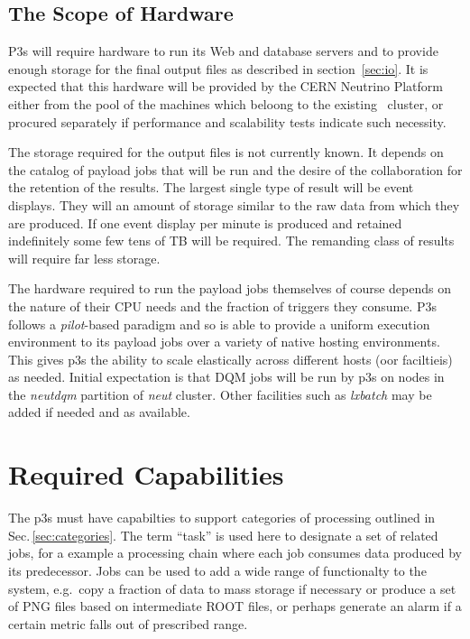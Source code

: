 \documentclass[pdftex,12pt,letter]{article}
\begin{document}
\subsection{The Scope of Hardware}
P3s will require hardware to run its Web and database servers
and to provide enough storage for the final output files as described in
section~\ref{sec:io}.  It is expected that this hardware will be provided
by the CERN Neutrino Platform either from the pool of the machines
which beloong to the existing~\cite{neut} cluster, or procured separately
if performance and scalability tests indicate such necessity.


The storage required for the output files is not currently known.  It
depends on the catalog of payload jobs that will be run and the desire
of the collaboration for the retention of the results.  The largest
single type of result will be event displays.  They will an amount of
storage similar to the raw data from which they are produced.  If one
event display per minute is produced and retained indefinitely some
few tens of TB will be required.  The remanding class of results will
require far less storage.

The hardware required to run the payload jobs themselves of course
depends on the nature of their CPU needs and the fraction of triggers
they consume.  P3s follows a \textit{pilot}-based paradigm and so is
able to provide a uniform execution environment to its payload jobs
over a variety of native hosting environments.  This gives p3s the ability
to scale elastically across different hosts (oor faciltieis) as needed.  Initial expectation
is that DQM jobs will be run by p3s on nodes in the \textit{neutdqm}
partition of \textit{neut} cluster.  Other facilities such as
\textit{lxbatch} \cite{lxbatch} may be added if needed and as available.


\section{Required Capabilities}
\label{sec:capabilities}

The p3s must have capabilties to support categories of processing outlined
in Sec.\,\ref{sec:categories}. The term ``task'' is used here to designate a set
of related jobs, for a example a processing chain where each job consumes
data produced by its predecessor. Jobs can be used to add a wide range
of functionalty to the system, e.g.~copy a fraction of data to mass storage
if necessary or produce a set of PNG files based on intermediate ROOT files,
or perhaps generate an alarm if a certain metric falls out of prescribed range.
\end{document}
